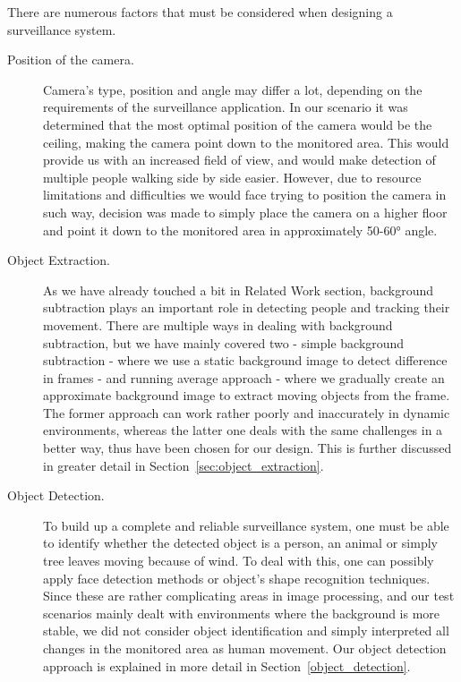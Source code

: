 There are numerous factors that must be considered when designing a surveillance system.
\begin{description}
\item[Position of the camera.] Camera's type, position and angle may differ a lot, depending on the requirements of the surveillance application. In our scenario it was determined that the most optimal position of the camera would be the ceiling, making the camera point down to the monitored area. This would provide us with an increased field of view, and would make detection of multiple people walking side by side easier. However, due to resource limitations and difficulties we would face trying to position the camera in such way, decision was made to simply place the camera on a higher floor and point it down to the monitored area in approximately 50-60\si{\degree} angle.

\item[Object Extraction.] As we have already touched a bit in Related Work section, background subtraction plays an important role in detecting people and tracking their movement. There are multiple ways in dealing with background subtraction, but we have mainly covered two - simple background subtraction - where we use a static background image to detect difference in frames - and running average approach - where we gradually create an approximate background image to extract moving objects from the frame. The former approach can work rather poorly and inaccurately in dynamic environments, whereas the latter one deals with the same challenges in a better way, thus have been chosen for our design. This is further discussed in greater detail in Section~\ref{sec:object_extraction}.

\item[Object Detection.] To build up a complete and reliable surveillance system, one must be able to identify whether the detected object is a person, an animal or simply tree leaves moving because of wind. To deal with this, one can possibly apply face detection methods or object's shape recognition techniques. Since these are rather complicating areas in image processing, and our test scenarios mainly dealt with environments where the background is more stable, we did not consider object identification and simply interpreted all changes in the monitored area as human movement. Our object detection approach is explained in more detail in Section~\ref{object_detection}.


\end{description}
